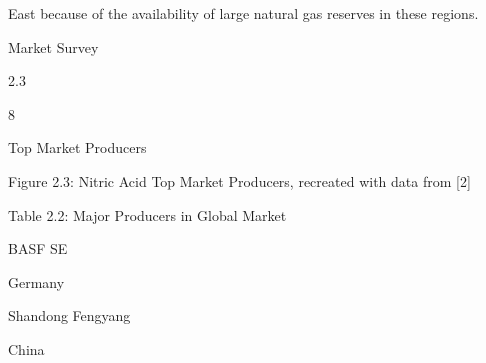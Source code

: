 \documentclass[a4paper,portrait,12pt]{article}
\begin{document}
\begin{flushleft}
East because of the availability of large natural gas reserves in these regions.
\end{flushleft}





\begin{flushleft}
\newpage
Market Survey
\end{flushleft}





2.3





8





\begin{flushleft}
Top Market Producers
\end{flushleft}





\begin{flushleft}
Figure 2.3: Nitric Acid Top Market Producers, recreated with data from [2]
\end{flushleft}


\begin{flushleft}
Table 2.2: Major Producers in Global Market
\end{flushleft}





\begin{flushleft}
BASF SE
\end{flushleft}





\begin{flushleft}
Germany
\end{flushleft}





\begin{flushleft}
Shandong Fengyang
\end{flushleft}





\begin{flushleft}
China
\end{flushleft}
\end{document}
